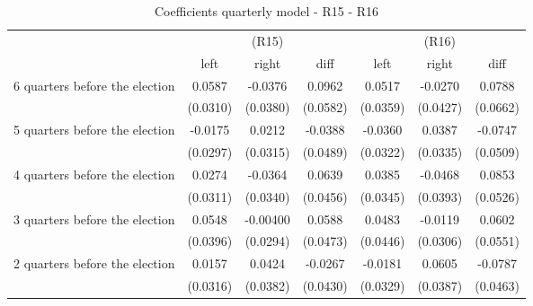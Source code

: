 \begin{table}[!ht]\centering \footnotesize
\def\sym#1{\ifmmode^{#1}\else\(^{#1}\)\fi}
\caption{Coefficients quarterly model - R15 - R16}
\begin{tabular}{l*{6}{c}}
\hline\hline
                    &\multicolumn{3}{c}{(R15)}&\multicolumn{3}{c}{(R16)}\\
&\multicolumn{1}{c}{left}&\multicolumn{1}{c}{right}&\multicolumn{1}{c}{diff}&\multicolumn{1}{c}{left}&\multicolumn{1}{c}{right}&\multicolumn{1}{c}{diff}\\
\hline
 6 quarters before the election&      0.0587         &     -0.0376         &      0.0962         &      0.0517         &     -0.0270         &      0.0788         \\
                    &    (0.0310)         &    (0.0380)         &    (0.0582)         &    (0.0359)         &    (0.0427)         &    (0.0662)         \\
[0.5em]
 5 quarters before the election&     -0.0175         &      0.0212         &     -0.0388         &     -0.0360         &      0.0387         &     -0.0747         \\
                    &    (0.0297)         &    (0.0315)         &    (0.0489)         &    (0.0322)         &    (0.0335)         &    (0.0509)         \\
[0.5em]
 4 quarters before the election&      0.0274         &     -0.0364         &      0.0639         &      0.0385         &     -0.0468         &      0.0853         \\
                    &    (0.0311)         &    (0.0340)         &    (0.0456)         &    (0.0345)         &    (0.0393)         &    (0.0526)         \\
[0.5em]
 3 quarters before the election&      0.0548         &    -0.00400         &      0.0588         &      0.0483         &     -0.0119         &      0.0602         \\
                    &    (0.0396)         &    (0.0294)         &    (0.0473)         &    (0.0446)         &    (0.0306)         &    (0.0551)         \\
[0.5em]
 2 quarters before the election&      0.0157         &      0.0424         &     -0.0267         &     -0.0181         &      0.0605         &     -0.0787         \\
                    &    (0.0316)         &    (0.0382)         &    (0.0430)         &    (0.0329)         &    (0.0387)         &    (0.0463)         \\

\end{tabular}
\end{table}
